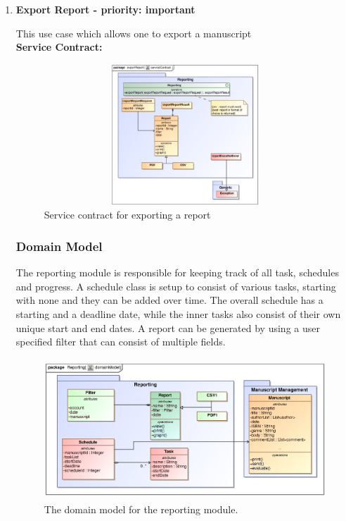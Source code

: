 \begin{enumerate}
\item \textbf{Export Report - priority: important}
\par{This use case which allows one to export a manuscript}\\
\textbf{Service Contract:} 

\begin{figure}[h]
\includegraphics[height=200px, width=500px]{epsImages/Reporting/exportReport.eps}
\caption{Service contract for exporting a report}
\end{figure}


\subsubsection{Domain Model}
\par{The reporting module is responsible for keeping track of all task, schedules and progress. A schedule class is setup to consist of various tasks, starting with none and they can be added over time. The overall schedule has a starting and a deadline date, while the inner tasks also consist of their own unique start and end dates. A report can be generated by using a user specified filter that can consist of multiple fields.}

\begin{figure}[h]
\includegraphics[height=200px, width=500px]{epsImages/DomainModels/Reporting.eps}
\caption{The domain model for the reporting module.}
\end{figure}
\newpage

\end{enumerate}

